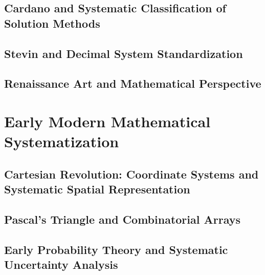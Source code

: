 \documentclass[12pt, oneside, openany]{book}
\begin{document}
\section{Cardano and Systematic Classification of Solution Methods}

\section{Stevin and Decimal System Standardization}

\section{Renaissance Art and Mathematical Perspective}


\chapter{Early Modern Mathematical Systematization}

\section{Cartesian Revolution: Coordinate Systems and Systematic Spatial Representation}

\section{Pascal's Triangle and Combinatorial Arrays}

\section{Early Probability Theory and Systematic Uncertainty Analysis}
\end{document}
